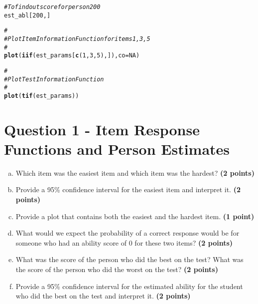 \documentclass{article}\usepackage[]{graphicx}\usepackage[]{color}
\makeatletter
\newcommand{\hlnum}[1]{\textcolor[rgb]{0.686,0.059,0.569}{#1}}%
\newcommand{\hlcom}[1]{\textcolor[rgb]{0.678,0.584,0.686}{\textit{#1}}}%
\newcommand{\hlstd}[1]{\textcolor[rgb]{0.345,0.345,0.345}{#1}}%
\newcommand{\hlkwc}[1]{\textcolor[rgb]{0.333,0.667,0.333}{#1}}%
\newcommand{\hlkwd}[1]{\textcolor[rgb]{0.737,0.353,0.396}{\textbf{#1}}}%
\newenvironment{kframe}{%
 \def\at@end@of@kframe{}%
 \ifinner\ifhmode%
  \def\at@end@of@kframe{\end{minipage}}%
  \begin{minipage}{\columnwidth}%
 \fi\fi%
 \def\FrameCommand##1{\hskip\@totalleftmargin \hskip-\fboxsep
 \colorbox{shadecolor}{##1}\hskip-\fboxsep
     \hskip-\linewidth \hskip-\@totalleftmargin \hskip\columnwidth}%
 \MakeFramed {\advance\hsize-\width
   \@totalleftmargin\z@ \linewidth\hsize
   \@setminipage}}%
 {\par\unskip\endMakeFramed%
 \at@end@of@kframe}
\newenvironment{knitrout}{}{} %
\makeatother
\begin{document}
\begin{knitrout}
\begin{kframe}
\begin{alltt}
\hlcom{# To find out score for person 200}
\hlstd{est_abl[}\hlnum{200}\hlstd{,]}

\hlcom{#}
\hlcom{# Plot Item Information Function for items 1, 3, 5}
\hlcom{#}
\hlkwd{plot}\hlstd{(}\hlkwd{iif}\hlstd{(est_params[}\hlkwd{c}\hlstd{(}\hlnum{1}\hlstd{,}\hlnum{3}\hlstd{,}\hlnum{5}\hlstd{),]),} \hlkwc{co} \hlstd{=} \hlnum{NA}\hlstd{)}


\hlcom{#}
\hlcom{# Plot Test Information Function}
\hlcom{#}
\hlkwd{plot}\hlstd{(}\hlkwd{tif}\hlstd{(est_params))}
\end{alltt}
\end{kframe}
\end{knitrout}

\section*{Question 1 - Item Response Functions and Person Estimates}
  
  \begin{enumerate}[(a)]
      \item Which item was the easiest item and which item was the hardest? \textbf{(2 points)}
      \item Provide a 95\% confidence interval for the easiest item and interpret it.  \textbf{(2 points)}
      \item Provide a plot that contains both the easiest and the hardest item.  \textbf{(1 point)}
      \item What would we expect the probability of a correct response would be for someone who had an ability score of 0 for these two items?  \textbf{(2 points)}
      \item What was the score of the person who did the best on the test? What was the score of the person who did the worst on the test?  \textbf{(2 points)}
      \item Provide a 95\% confidence interval for the estimated ability for the student who did the best on the test and interpret it.  \textbf{(2 points)}
  \end{enumerate}
  
\vspace{1cm}
\end{document}
